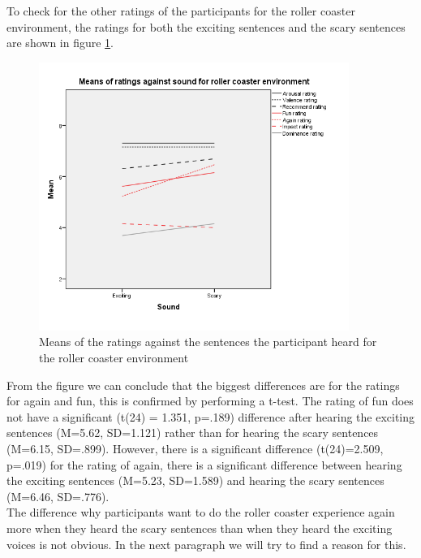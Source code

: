 \documentclass[Results.tex]{subfiles}
\begin{document}
To check for the other ratings of the participants for the roller coaster environment, the ratings for both the exciting sentences and the scary sentences are shown in figure \ref{fig:Ratings2_sound_RC}. 

\begin{figure}[H]
	\centering
		\includegraphics[width=0.90\textwidth]{Section_1/Figures/Ratings2_sound_RC.png}
	\caption{Means of the ratings against the sentences the participant heard for the roller coaster environment}
	\label{fig:Ratings2_sound_RC}
\end{figure}

From the figure we can conclude that the biggest differences are for the ratings for again and fun, this is confirmed by performing a t-test. The rating of fun does not have a significant (t(24) = 1.351, p=.189) difference after hearing the exciting sentences (M=5.62, SD=1.121) rather than for hearing the scary sentences (M=6.15, SD=.899). However, there is a significant difference (t(24)=2.509, p=.019) for the rating of again, there is a significant difference between hearing the exciting sentences (M=5.23, SD=1.589) and hearing the scary sentences (M=6.46, SD=.776). \\

The difference why participants want to do the roller coaster experience again more when they heard the scary sentences than when they heard the exciting voices is not obvious. In the next paragraph we will try to find a reason for this. 
\end{document}

